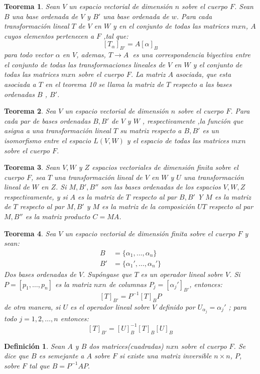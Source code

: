 \documentclass[b5paper, 11pt]{book}
\newcommand{\0}{\mathbf{0}}
\theoremstyle{estiloB}
\theoremstyle{estiloC}
\newtheorem{unteo}{Teorema}[chapter]
\newtheorem{unadefi}{Definición}[chapter]
\theoremstyle{estiloD}
\theoremstyle{estiloE}
\begin{document}
\begin{unteo}
Sean $V$ un espacio vectorial de dimensi\'on $n$ sobre el cuerpo $F$. Sean $B$ una base ordenada de $V$ y $B'$ una base ordenada de $w$. Para cada transformaci\'on lineal $T$  de $V$ en $W$ y en el conjunto de todas las matrices $m x n$, $A$ cuyos elementos pertenecen a $F$ ,tal que:
\[
\left[T_{\alpha}\right]_{B'} = A\left[\alpha\right]_{B}
\]
para todo vector $\alpha$ en $V$, ademas, $ T \rightarrow A\ $ es una correspondencia biyectiva entre el conjunto de todas las transformaciones lineales de $V$ en $W$ y el conjunto de todas las matrices $mxn$ sobre el cuerpo $F$. La matriz $A$ asociada, que esta asociada a $T$ en el teorema 10 se llama la \textit{matriz de $T$ respecto a las bases ordenadas $B$ , $B'$}.
\end{unteo}

\begin{unteo}
Sea $V$ un espacio vectorial de dimensi\'on $n$ sobre el cuerpo $F$. Para cada par de bases ordenadas $B,B'$ de $V$ y $W$ , respectivamente ,la funci\'on que asigna a una transformaci\'on lineal $T$ su matriz respecto a $B,B'$ es un isomorfismo entre el espacio  $L(V,W)$ y el espacio de todas las matrices $mxn$ sobre el cuerpo $F$.
\end{unteo}

\begin{unteo}
Sean $V,W$ y $Z$ espacios vectoriales de dimensi\'on finita sobre el cuerpo $F$, sea $T$ una transformaci\'on lineal de $V$ en $W$ y $U$ una transformaci\'on lineal de $W$ en $Z$. Si $M,B',B''$ son las bases ordenadas de los espacios $V,W,Z$ respectivamente, y si $A$ es la matriz de $T$ respecto al par $B,B' $ Y $M$ es la matriz de $T$ respecto al par  $M,B'$ y $M$ es la matriz de la composici\'on $UT$ respecto al par $M,B''$ es la matriz producto $C = MA$.
\end{unteo}
\begin{unteo}
Sea $V$ un espacio vectorial de dimensi\'on finita sobre el cuerpo $F$ y sean:
\begin{align*}
B &= \{\alpha_{1},\ldots ,\alpha_{n}\}\\
B' &= \{\alpha_{1}',\ldots ,\alpha_{n}'\}
\end{align*}
Dos bases ordenadas de $V$. Sup\'ongase que $T$ es un operador lineal sobre $V$. Si $P = \left[ p_{1},\ldots ,p_{n}\right]$ es la matriz $nxn$ de columnas $P_{j} = \left[ \alpha_{j}'\right]_{B'}$, entonces:
\[
\left[ T \right]_{B'} = P^{-1}\left[ T \right]_{B}P
\]
de otra manera, si $U$ es el operador lineal sobre $V$ definido por $U_{\alpha_{j}} = \alpha_{j}'$ ; para todo  $j = 1,2,\ldots ,n$ entonces:
\[
\left[T\right]_{B'} = \left[U\right]_{B}^{-1}\left[T\right]_{B}\left[U\right]_{B}
\]
\end{unteo}
\begin{unadefi}
Sean $A$ y $B$ dos matrices(cuadradas) $nxn$ sobre el cuerpo $F$. Se dice que $B$ es semejante a $A$ sobre $F$ si existe una matriz inversible $n \times n$, $P$, sobre  $F$ tal que $B = P^{-1}AP.$
\end{unadefi}
\end{document}
